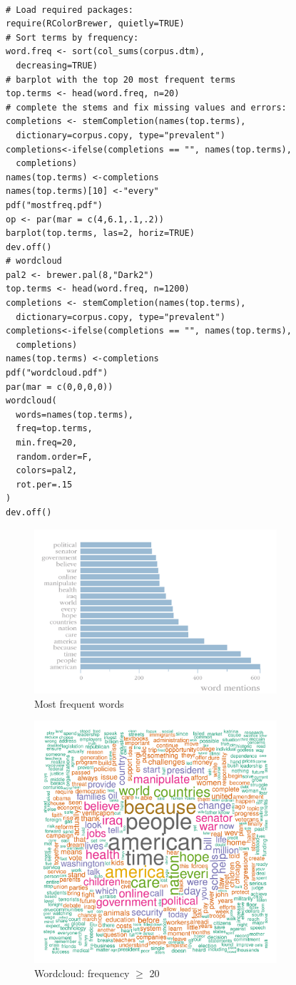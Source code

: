 \documentclass[%
	final,
	notitlepage,
	narroweqnarray,
	inline,
	]{ieee}
\begin{document}
\begin{verbatim}

# Load required packages:
require(RColorBrewer, quietly=TRUE)
# Sort terms by frequency:
word.freq <- sort(col_sums(corpus.dtm), 
  decreasing=TRUE)
# barplot with the top 20 most frequent terms
top.terms <- head(word.freq, n=20)
# complete the stems and fix missing values and errors:
completions <- stemCompletion(names(top.terms), 
  dictionary=corpus.copy, type="prevalent")
completions<-ifelse(completions == "", names(top.terms), 
  completions)
names(top.terms) <-completions
names(top.terms)[10] <-"every"
pdf("mostfreq.pdf")
op <- par(mar = c(4,6.1,.1,.2))
barplot(top.terms, las=2, horiz=TRUE)
dev.off()
# wordcloud
pal2 <- brewer.pal(8,"Dark2")
top.terms <- head(word.freq, n=1200)
completions <- stemCompletion(names(top.terms), 
  dictionary=corpus.copy, type="prevalent")
completions<-ifelse(completions == "", names(top.terms), 
  completions)
names(top.terms) <-completions
pdf("wordcloud.pdf")
par(mar = c(0,0,0,0))
wordcloud(
  words=names(top.terms), 
  freq=top.terms, 
  min.freq=20, 
  random.order=F, 
  colors=pal2, 
  rot.per=.15
)
dev.off()
\end{verbatim}

\begin{figure}[ht!]
\centering
\includegraphics[width=90mm]{mostfreq.pdf}
\caption{Most frequent words}
\label{fig:barchart}
\end{figure}

\begin{figure}[ht!]
\centering
\includegraphics[width=90mm]{wordcloud.pdf}
\caption{Wordcloud: frequency $\geq$ 20}
\label{fig:wordcloud}
\end{figure}
\end{document}
